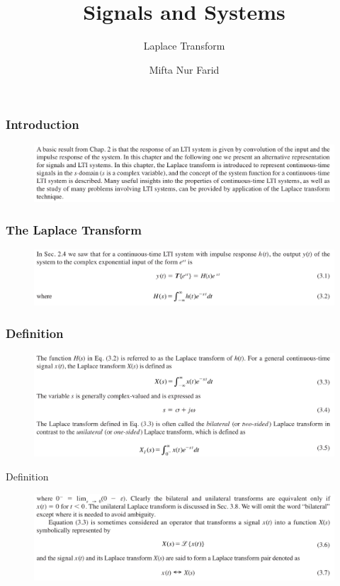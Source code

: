 \documentclass[pdflatex,compress,mathserif]{beamer}
\title{Signals and Systems}
\subtitle{Laplace Transform}
\author{Mifta Nur Farid}
\begin{document}
\maketitle

\begin{frame}
	\frametitle{Introduction}
	\begin{figure}
		\centering
		\includegraphics[width=\linewidth]{img/img01}
	\end{figure}
\end{frame}

\begin{frame}
	\frametitle{The Laplace Transform}
	\begin{figure}
		\centering
		\includegraphics[width=\linewidth]{img/img02}
	\end{figure}
\end{frame}

\begin{frame}
	\frametitle{Definition}
	\begin{figure}
		\centering
		\includegraphics[width=\linewidth]{img/img03}
	\end{figure}
\end{frame}

\begin{frame}{Definition}
	\begin{figure}
		\centering
		\includegraphics[width=\linewidth]{img/img04}
	\end{figure}
\end{frame}
\end{document}
